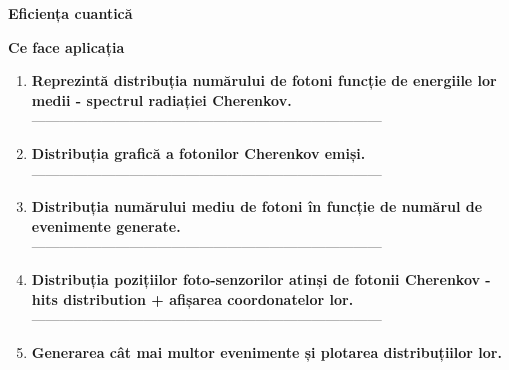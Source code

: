 \documentclass[10pt]{beamer}
\begin{document}
\begin{frame}{\textbf{Eficiența cuantică}}


\end{frame}



\begin{frame}{\textbf{Ce face aplicația}}

\vspace{0cm}
\begin{enumerate}

\large
    \item \makebox[0.5cm]{} \textbf{Reprezintă distribuția numărului de fotoni funcție de energiile lor medii - spectrul radiației Cherenkov.}
    \\---------------------------------------------------------------------------
    \item \makebox[0.5cm]{} \textbf{Distribuția grafică a fotonilor Cherenkov emiși.}
    \\---------------------------------------------------------------------------
    \item \makebox[0.5cm]{} \textbf{Distribuția numărului mediu de fotoni în funcție de numărul de evenimente generate.}
    \\---------------------------------------------------------------------------
    \item \makebox[0.5cm]{} \textbf{Distribuția pozițiilor foto-senzorilor atinși de fotonii Cherenkov - hits distribution + afișarea coordonatelor lor.} 
    \\---------------------------------------------------------------------------
    \item \makebox[0.5cm]{} \textbf{Generarea cât mai multor evenimente și plotarea distribuțiilor lor.} 
    
\end{enumerate}
\end{frame}
\end{document}
